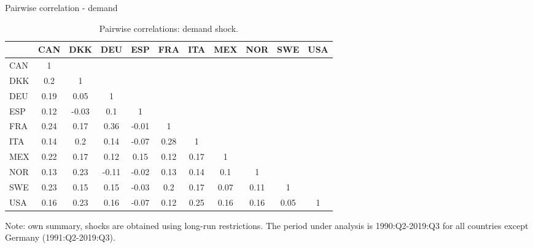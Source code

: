 \documentclass[10pt,leqno,aspectratio=169,presentation]{beamer} %
\begin{document}
\begin{frame}{Pairwise correlation - demand}
    \begin{table}[H]
\captionsetup{justification=raggedright,
singlelinecheck=false
}
    \centering
    \scriptsize
    \caption{Pairwise correlations: demand shock.}
    \begin{tabular}{l ccc ccc ccc c}
    \toprule
 & CAN & DKK & DEU & ESP & FRA & ITA & MEX & NOR & SWE & USA \\ 
  \hline
CAN & 1 &  &  &  &  &  &  &  &  &  \\ 
  DKK & 0.2 & 1 &  &  &  &  &  &  &  &  \\ 
  DEU & 0.19 & 0.05 & 1 &  &  &  &  &  &  &  \\ 
  ESP & 0.12 & -0.03 & 0.1 & 1 &  &  &  &  &  &  \\ 
  FRA & 0.24 & 0.17 & 0.36 & -0.01 & 1 &  &  &  &  &  \\ 
  ITA & 0.14 & 0.2 & 0.14 & -0.07 & 0.28 & 1 &  &  &  &  \\ 
  MEX & 0.22 & 0.17 & 0.12 & 0.15 & 0.12 & 0.17 & 1 &  &  &  \\ 
  NOR & 0.13 & 0.23 & -0.11 & -0.02 & 0.13 & 0.14 & 0.1 & 1 &  &  \\ 
  SWE & 0.23 & 0.15 & 0.15 & -0.03 & 0.2 & 0.17 & 0.07 & 0.11 & 1 &  \\ 
  USA & 0.16 & 0.23 & 0.16 & -0.07 & 0.12 & 0.25 & 0.16 & 0.16 & 0.05 & 1 \\ 
    \bottomrule
    \end{tabular}
    \begin{minipage}{\textwidth}
    \vspace{0.1cm}
    \footnotesize Note: own summary, shocks are obtained using long-run restrictions. The period under analysis is 1990:Q2-2019:Q3 for all countries except Germany (1991:Q2-2019:Q3).
    \end{minipage}
    \label{table:a3}
\end{table}

 
\hfill \hyperlink{ortho}{}    
 
\end{frame}
\end{document}
